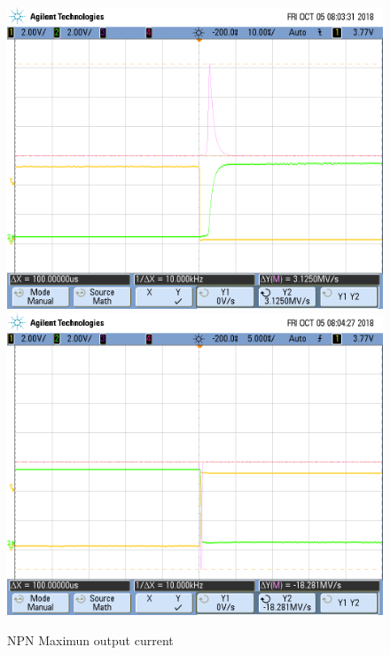 \begin{figure}[h!]
\centering
\includegraphics[scale=0.2]{../Exercise1/i_npn2.png}\hspace{1cm}
\includegraphics[scale=0.2]{../Exercise1/i_npn3.png}
\caption{NPN Maximun output current}
\label{circnpnmaxout}
\end{figure}


